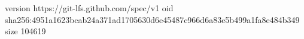 version https://git-lfs.github.com/spec/v1
oid sha256:4951a1623bcab24a371ad1705630d6e45487c966d6a83e5b499a1fa8e484b349
size 104619
